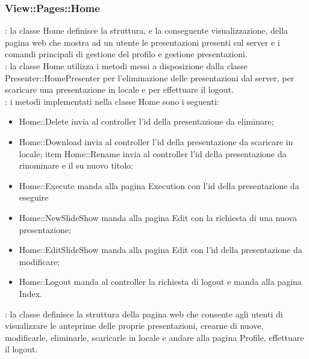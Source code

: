{{		\subsubsection{View::Pages::Home}{
			\textbf{\tipo}: la classe Home definisce la struttura, e la conseguente visualizzazione, della pagina web che mostra ad un utente le presentazioni presenti sul server e i comandi principali di gestione del profilo e gestione presentazioni.\\	
			\textbf{\relaz}: la classe Home utilizza i metodi messi a disposizione dalla classe Presenter::HomePresenter per l'eliminazione delle presentazioni dal server, per scaricare una presentazione in locale e per effettuare il logout.\\
			\textbf{\interfacce}: i metodi implementati nella classe Home sono i seguenti:
			\begin{itemize}
				\item Home::Delete invia al controller l'id della presentazione da eliminare;
				\item Home::Download invia al controller l'id della presentazione da scaricare in locale;
				item Home::Rename invia al controller l'id della presentazione da rinominare e il su nuovo titolo;
				\item Home::Execute manda alla pagina Execution con l'id della presentazione da eseguire
				\item Home::NewSlideShow manda alla pagina Edit con la richiesta di una nuova presentazione;
				\item Home::EditSlideShow manda alla pagina Edit con l'id della presentazione da modificare;
				\item Home::Logout manda al controller la richiesta di logout e manda alla pagina Index.				
			\end{itemize} 
			\textbf{\attivita}: la classe definisce la struttura della pagina web che consente agli utenti di visualizzare le anteprime delle proprie presentazioni, crearne di nuove, modificarle, eliminarle, scaricarle in locale e andare alla pagina Profile, effettuare il logout.\\
		}
}}
